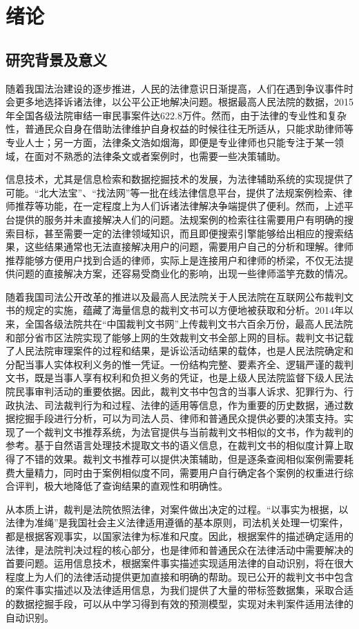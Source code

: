 ﻿\chapter{绪论}

    \section{研究背景及意义}
    随着我国法治建设的逐步推进，人民的法律意识日渐提高，人们在遇到争议事件时会更多地选择诉诸法律，以公平公正地解决问题。根据最高人民法院的数据，2015年全国各级法院审结一审民事案件达622.8万件。然而，由于法律的专业性和复杂性，普通民众自身在借助法律维护自身权益的时候往往无所适从，只能求助律师等专业人士；另一方面，法律条文浩如烟海，即便是专业律师也只能专注于某一领域，在面对不熟悉的法律条文或者案例时，也需要一些决策辅助。

    信息技术，尤其是信息检索和数据挖掘技术的发展，为法律辅助系统的实现提供了可能。“北大法宝”、“找法网”等一批在线法律信息平台，提供了法规案例检索、律师推荐等功能，在一定程度上为人们诉诸法律解决争端提供了便利。然而，上述平台提供的服务并未直接解决人们的问题。法规案例的检索往往需要用户有明确的搜索目标，甚至需要一定的法律领域知识，而且即便搜索引擎能够给出相应的搜索结果，这些结果通常也无法直接解决用户的问题，需要用户自己的分析和理解。律师推荐能够方便用户找到合适的律师，实际上是连接用户和律师的桥梁，不仅无法提供问题的直接解决方案，还容易受商业化的影响，出现一些律师滥竽充数的情况。

    随着我国司法公开改革的推进以及最高人民法院关于人民法院在互联网公布裁判文书的规定的实施，蕴藏了海量信息的裁判文书可以方便地被获取和分析。2014年以来，全国各级法院共在“中国裁判文书网”上传裁判文书六百余万份，最高人民法院和部分省市区法院实现了能够上网的生效裁判文书全部上网的目标。裁判文书记载了人民法院审理案件的过程和结果，是诉讼活动结果的载体，也是人民法院确定和分配当事人实体权利义务的惟一凭证。一份结构完整、要素齐全、逻辑严谨的裁判文书，既是当事人享有权利和负担义务的凭证，也是上级人民法院监督下级人民法院民事审判活动的重要依据。因此，裁判文书中包含的当事人诉求、犯罪行为、行政执法、司法裁判行为和过程、法律的适用等信息，作为重要的历史数据，通过数据挖掘手段进行分析，可以为司法人员、律师和普通民众提供必要的决策支持。实现了一个裁判文书推荐系统，为法官提供与当前裁判文书相似的文书，作为裁判的参考。基于自然语言处理技术提取文书的语义信息，在裁判文书的相似度计算上取得了不错的效果。裁判文书推荐可以提供决策辅助，但是逐条查阅相似案例需要耗费大量精力，同时由于案例相似度不同，需要用户自行确定各个案例的权重进行综合评判，极大地降低了查询结果的直观性和明确性。

    从本质上讲，裁判是法院依照法律，对案件做出决定的过程。“以事实为根据，以法律为准绳”是我国社会主义法律适用遵循的基本原则，司法机关处理一切案件，都是根据客观事实，以国家法律为标准和尺度。因此，根据案件的描述确定适用的法律，是法院判决过程的核心部分，也是律师和普通民众在法律活动中需要解决的首要问题。运用信息技术，根据案件事实描述实现适用法律的自动识别，将在很大程度上为人们的法律活动提供更加直接和明确的帮助。现已公开的裁判文书中包含的案件事实描述以及法律适用信息，为我们提供了大量的带标签数据集，采取合适的数据挖掘手段，可以从中学习得到有效的预测模型，实现对未判案件适用法律的自动识别。



